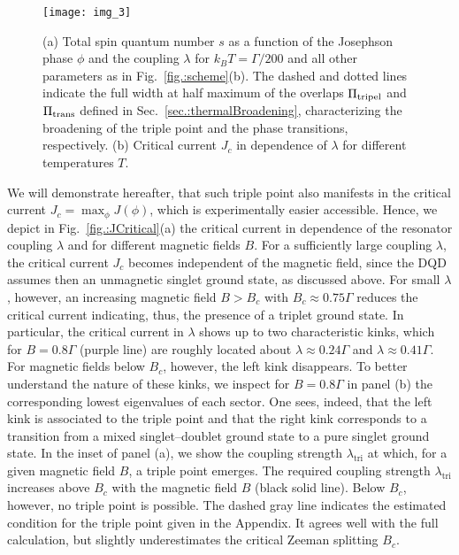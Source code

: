 \documentclass[aps,prb,twocolumn,superscriptaddress,amsmath,amssymb,longbibliography]{revtex4-1}
\begin{document}
	\begin{figure}[t]
		\texttt{[image: img\_3]}		%
		\caption{\label{fig.:finiteT}
		(a) Total spin quantum number $s$ as a function of the Josephson phase $\phi$ and the coupling $\lambda$ for
		$k_BT=\Gamma/200$ and all other parameters as in Fig.~\ref{fig.:scheme}(b). The dashed
		and dotted lines indicate the full width at half maximum of the overlaps $\Pi_{\rm tripel}$ and $\Pi_{\rm trans}$ 
		defined in Sec.~\ref{sec.:thermalBroadening}, characterizing the broadening of the triple point and the phase transitions, respectively.  
		(b) Critical current $J_c$ in dependence of $\lambda$ for different temperatures $T$.
		}
	\end{figure}
	We will demonstrate hereafter, that such triple point also manifests in the critical current $J_c=\max_\phi J(\phi)$, which is 
	experimentally easier accessible. Hence, we depict in Fig.~\ref{fig.:JCritical}(a) the critical current in dependence of the resonator 
	coupling $\lambda$ and for different magnetic fields $B$. For a sufficiently large coupling $\lambda$, the critical current $J_c$ becomes independent 
	of the magnetic field, since the DQD assumes then an unmagnetic singlet ground state, as discussed above. For small $\lambda$, however, 
	an increasing magnetic field $B>B_c$ with $B_c\approx0.75\Gamma$ reduces the critical current indicating, thus, the presence of a
	triplet ground state. In particular, the critical current in $\lambda$ shows up to two characteristic kinks, which for $B=0.8\Gamma$ (purple line) 
	are roughly located about $\lambda\approx0.24\Gamma$ and  $\lambda\approx0.41\Gamma$. For magnetic fields below $B_c$, however, the left kink disappears.
	To better understand the nature of these kinks, we inspect for $B=0.8\Gamma$ in panel (b) the corresponding lowest eigenvalues of each sector.
	One sees, indeed, that the left kink is associated to the triple point and that the right kink corresponds to a transition from a mixed singlet--doublet 
	ground state to a pure singlet ground state.
	In the inset of panel (a), we show the coupling strength $\lambda_{\textrm{tri}}$ at which, for a given magnetic field $B$, a triple point emerges.
	The required coupling strength $\lambda_{\textrm{tri}}$ increases above $B_c$ with the magnetic field $B$ (black solid line). Below $B_c$, however, 
	no triple point is possible. The dashed gray line indicates the estimated condition for the triple point given in the Appendix. It agrees well
	with the full calculation, but slightly underestimates the critical Zeeman splitting $B_c$.
	
\end{document}

